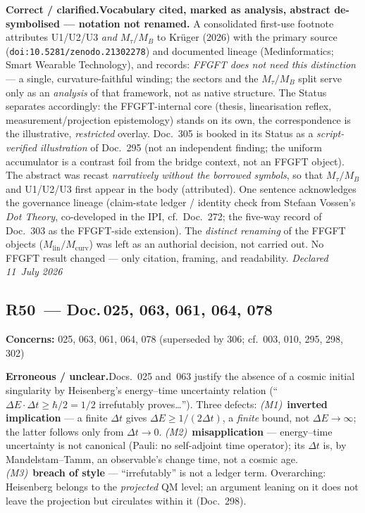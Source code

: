 \smallskip\noindent\textbf{Correct / clarified.}\quad \textbf{Vocabulary cited, marked as analysis, abstract de-symbolised --- notation not renamed.} A consolidated first-use footnote attributes U1/U2/U3 \emph{and} $M_\tau/M_B$ to Krüger (2026) with the primary source (\texttt{doi:10.5281/zenodo.21302278}) and documented lineage (Medinformatics; Smart Wearable Technology), and records: \emph{FFGFT does not need this distinction} --- a single, curvature-faithful winding; the sectors and the $M_\tau/M_B$ split serve only as an \emph{analysis} of that framework, not as native structure. The Status separates accordingly: the FFGFT-internal core (thesis, linearisation reflex, measurement/projection epistemology) stands on its own, the correspondence is the illustrative, \emph{restricted} overlay. Doc.~305 is booked in its Status as a \emph{script-verified illustration} of Doc.~295 (not an independent finding; the uniform accumulator is a contrast foil from the bridge context, not an FFGFT object). The abstract was recast \emph{narratively without the borrowed symbols}, so that $M_\tau/M_B$ and U1/U2/U3 first appear in the body (attributed). One sentence acknowledges the governance lineage (claim-state ledger / identity check from Stefaan Vossen's \emph{Dot Theory}, co-developed in the IPI, cf.\ Doc.~272; the five-way record of Doc.~303 as the FFGFT-side extension). The \emph{distinct renaming} of the FFGFT objects ($M_{\mathrm{lin}}/M_{\mathrm{curv}}$) was left as an authorial decision, not carried out. No FFGFT result changed --- only citation, framing, and readability. \emph{Declared 11~July 2026}


\medskip


\subsection*{R50~--- Doc.\,025, 063, 061, 064, 078}

\noindent\textbf{Concerns:} 025, 063, 061, 064, 078 (superseded by 306; cf.\ 003, 010, 295, 298, 302)


\smallskip\noindent\textbf{Erroneous / unclear.}\quad Docs.~025 and~063 justify the absence of a cosmic initial singularity by Heisenberg's energy--time uncertainty relation (\enquote{$\Delta E\cdot\Delta t \ge \hbar/2 = 1/2$ irrefutably proves\ldots}). Three defects: \emph{(M1)}~\textbf{inverted implication} --- a finite $\Delta t$ gives $\Delta E \ge 1/(2\Delta t)$, a \emph{finite} bound, not $\Delta E\to\infty$; the latter follows only from $\Delta t\to 0$. \emph{(M2)}~\textbf{misapplication} --- energy--time uncertainty is not canonical (Pauli: no self-adjoint time operator); its $\Delta t$ is, by Mandelstam--Tamm, an observable's change time, not a cosmic age. \emph{(M3)}~\textbf{breach of style} --- \enquote{irrefutably} is not a ledger term. Overarching: Heisenberg belongs to the \emph{projected} QM level; an argument leaning on it does not leave the projection but circulates within it (Doc.~298).


